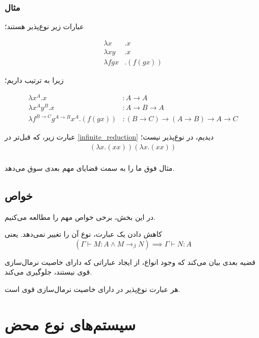 \subsubsection{مثال}
عبارات زیر نوع‌پذیر هستند؛

\begin{align*}
\lambda x&.x \\
\lambda xy&.x \\
\lambda fgx&.(f(gx))
\end{align*}

زیرا به ترتیب داریم؛

\begin{align*}
\lambda x^A.x &: A \to A\\
\lambda x^Ay^B.x &: A \to B \to A\\
\lambda f^{B \to C}g^{A \to B}x^A.(f(gx)) &: (B \to C) \to (A \to B) \to A \to C
\end{align*}

عبارت زیر، که قبل‌تر در
\ref{infinite_reduction}
دیدیم، در
نوع‌پذیر نیست؛
\begin{align*}
(\lambda x.(xx))(\lambda x.(xx)) \\
\end{align*}

مثال فوق ما را به سمت قضایای مهم بعدی سوق می‌دهد.

\subsection*{خواص}
در این بخش، برخی خواص مهم
را مطالعه می‌کنیم.

\begin{thm}
کاهش دادن یک عبارت، نوع آن را تغییر نمی‌دهد. یعنی
\begin{equation*}
(\Gamma \vdash M : A \land M \rightarrow_\beta N) \implies \Gamma \vdash N : A
\end{equation*}
\end{thm}

قضیه بعدی بیان می‌کند که وجود انواع، از ایجاد عباراتی که دارای خاصیت نرمال‌سازی قوی نیستند، جلوگیری می‌کند.

\begin{thm}
هر عبارت نوع‌پذیر در
دارای خاصیت نرمال‌سازی قوی است.
\end{thm}

\section{سیستم‌های نوع محض}

